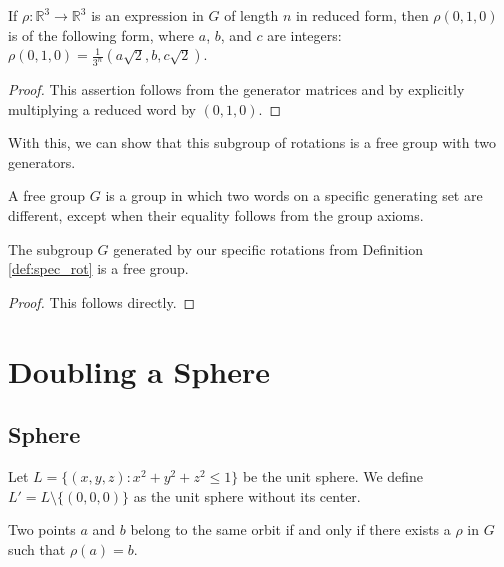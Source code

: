 \begin{lemma}\label{lem:repr_of_rot_res}
If $\rho : \mathbb{R}^3 \rightarrow \mathbb{R}^3$ is an expression in $G$ of length $n$ in reduced form, then $\rho(0,1,0)$ is of the following form, where $a$, $b$, and $c$ are integers: $\rho(0,1,0) = \frac{1}{3^n}(a\sqrt{2}, b, c\sqrt{2})$.
\end{lemma}
\begin{proof} 
This assertion follows from the generator matrices and by explicitly multiplying a reduced word by $(0,1,0)$.
\end{proof}

With this, we can show that this subgroup of rotations is a free group with two generators.

\begin{definition}\label{def:free_grp}
A free group $G$ is a group in which two words on a specific generating set are different, except when their equality follows from the group axioms.
\end{definition}

\begin{theorem}\label{thm:free_grp_of_rot}
The subgroup $G$ generated by our specific rotations from Definition \ref{def:spec_rot} is a free group.
\end{theorem}
\begin{proof}
This follows directly.
\end{proof}
\chapter{Doubling a Sphere}

\section{Sphere}
\begin{definition}\label{def:sphere_without_center}
Let $L = \{(x,y,z) : x^2 + y^2 + z^2 \leq 1\}$ be the unit sphere. We define $L' = L \setminus \{(0,0,0)\}$ as the unit sphere without its center.
\end{definition}

\begin{definition}[Orbit] \label{def:orbit} 
Two points $a$ and $b$ belong to the same orbit if and only if there exists a $\rho$ in $G$ such that $\rho(a) = b$.
\end{definition}

